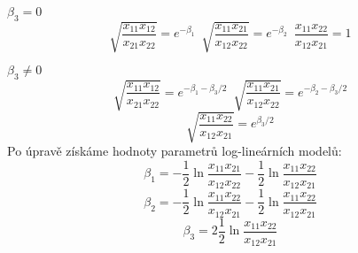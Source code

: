 \documentclass[landscape,a0paper,fontscale=0.285]{baposter} %
\begin{document}
\begin{poster}
{\vspace{0.5cm}

$\beta_{3}=0$
\begin{displaymath}
\sqrt{\frac{x_{11}x_{12}}{x_{21}x_{22}}}=e^{-\beta_{1}}\,\,\,\sqrt{\frac{x_{11}x_{21}}{x_{12}x_{22}}}=e^{-\beta_{2}}\,\,\,\frac{x_{11}x_{22}}{x_{12}x_{21}}=1
\end{displaymath}

\vspace{0.5cm}

$\beta_{3}\neq 0$
\begin{displaymath}
\sqrt{\frac{x_{11}x_{12}}{x_{21}x_{22}}}=e^{-\beta_{1}-\beta_{3}/2}\,\,\,\sqrt{\frac{x_{11}x_{21}}{x_{12}x_{22}}}=e^{-\beta_{2}-\beta_{3}/2}
\end{displaymath}
\begin{displaymath}
\sqrt{\frac{x_{11}x_{22}}{x_{12}x_{21}}}=e^{\beta_{3}/2}
\end{displaymath}
Po úpravě získáme hodnoty parametrů log-lineárních modelů:
\begin{displaymath}
\beta_{1}=-\frac{1}{2}\ln\frac{x_{11}x_{21}}{x_{12}x_{22}}-\frac{1}{2}\ln\frac{x_{11}x_{22}}{x_{12}x_{21}}
\end{displaymath}
\begin{displaymath}
\beta_{2}=-\frac{1}{2}\ln\frac{x_{11}x_{22}}{x_{12}x_{21}}-\frac{1}{2}\ln\frac{x_{11}x_{22}}{x_{12}x_{21}}
\end{displaymath}
\begin{displaymath}
\beta_{3}=2\frac{1}{2}\ln\frac{x_{11}x_{22}}{x_{12}x_{21}}
\end{displaymath}
}
\end{poster}
\end{document}
